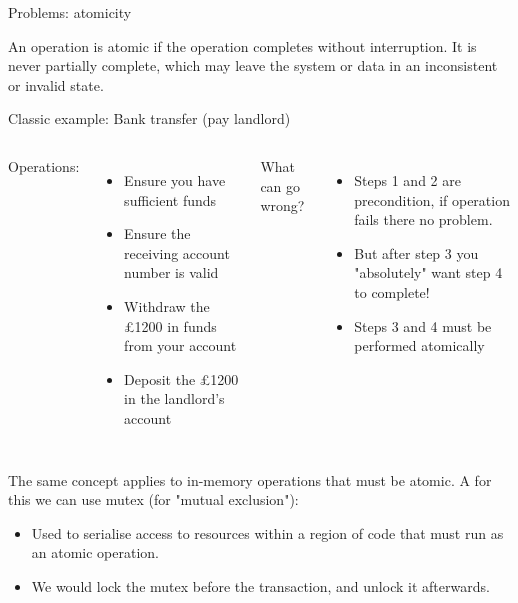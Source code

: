 \documentclass[8pt]{beamer}
\begin{document}
\begin{frame}{Problems: atomicity}
 
An operation is atomic if the operation completes without interruption. It is never partially complete, which may leave the system or data in an inconsistent or invalid state.

\begin{block}{Classic example: Bank transfer (pay landlord)}
\footnotesize

\begin{columns}
 
Operations:
\begin{itemize}
  \item Ensure you have sufficient funds
  \item Ensure the receiving account number is valid
  \item Withdraw the £1200 in funds from your account
  \item Deposit the £1200 in the landlord’s account
\end{itemize}

What can go wrong?
\begin{itemize}
  \item Steps 1 and 2 are precondition, if operation fails there no problem.
  \item But after step 3 you "absolutely" want step 4 to complete!
  \item Steps 3 and 4 must be performed atomically
\end{itemize}

\end{columns}

\end{block}

The same concept applies to in-memory operations that must be atomic. A for this we can use mutex (for "mutual exclusion"):
\begin{itemize}
  \item Used to serialise access to resources within a region of code that must run as an atomic operation.
  \item We would lock the mutex before the transaction, and unlock it afterwards.
\end{itemize}

\end{frame}
\end{document}
